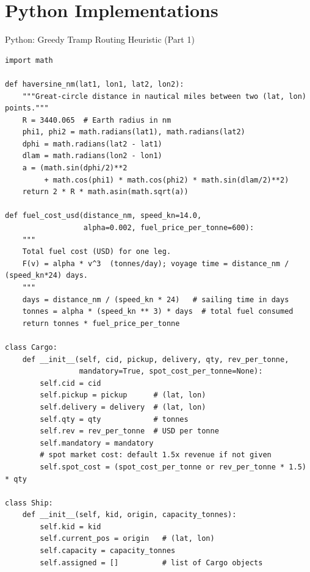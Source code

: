 \documentclass[aspectratio=169,10pt]{beamer}
\begin{document}
\section{Python Implementations}

\begin{frame}[fragile]{Python: Greedy Tramp Routing Heuristic (Part 1)}
\begin{lstlisting}[caption={Greedy construction heuristic for the tramp pickup-and-delivery problem.
                             Implements the insertion-based procedure from Section 13.2.}]
import math

def haversine_nm(lat1, lon1, lat2, lon2):
    """Great-circle distance in nautical miles between two (lat, lon) points."""
    R = 3440.065  # Earth radius in nm
    phi1, phi2 = math.radians(lat1), math.radians(lat2)
    dphi = math.radians(lat2 - lat1)
    dlam = math.radians(lon2 - lon1)
    a = (math.sin(dphi/2)**2
         + math.cos(phi1) * math.cos(phi2) * math.sin(dlam/2)**2)
    return 2 * R * math.asin(math.sqrt(a))

def fuel_cost_usd(distance_nm, speed_kn=14.0,
                  alpha=0.002, fuel_price_per_tonne=600):
    """
    Total fuel cost (USD) for one leg.
    F(v) = alpha * v^3  (tonnes/day); voyage time = distance_nm / (speed_kn*24) days.
    """
    days = distance_nm / (speed_kn * 24)   # sailing time in days
    tonnes = alpha * (speed_kn ** 3) * days  # total fuel consumed
    return tonnes * fuel_price_per_tonne

class Cargo:
    def __init__(self, cid, pickup, delivery, qty, rev_per_tonne,
                 mandatory=True, spot_cost_per_tonne=None):
        self.cid = cid
        self.pickup = pickup      # (lat, lon)
        self.delivery = delivery  # (lat, lon)
        self.qty = qty            # tonnes
        self.rev = rev_per_tonne  # USD per tonne
        self.mandatory = mandatory
        # spot market cost: default 1.5x revenue if not given
        self.spot_cost = (spot_cost_per_tonne or rev_per_tonne * 1.5) * qty

class Ship:
    def __init__(self, kid, origin, capacity_tonnes):
        self.kid = kid
        self.current_pos = origin   # (lat, lon)
        self.capacity = capacity_tonnes
        self.assigned = []          # list of Cargo objects
\end{lstlisting}
\end{frame}
\end{document}

